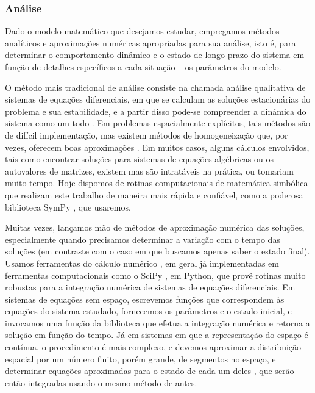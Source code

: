 \documentclass[12pt]{extarticle}
\begin{document}
\subsubsection{Análise}

Dado o modelo matemático que desejamos estudar, empregamos métodos analíticos
e aproximações numéricas apropriadas para sua análise, isto é, para determinar
o comportamento dinâmico e o estado de longo prazo do sistema em função de
detalhes específicos a cada situação -- os parâmetros do modelo.

O método mais tradicional de análise consiste na chamada análise qualitativa
de sistemas de equações diferenciais, em que se calculam as soluções
estacionárias do problema e sua estabilidade, e a partir disso pode-se
compreender a dinâmica do sistema como um todo \citep{murray2002,gurney1998}.
Em problemas espacialmente explícitos, tais métodos são de difícil
implementação, mas existem métodos de homogeneização que, por vezes, oferecem
boas aproximações \citep{cobbold2014}. Em muitos casos, alguns cálculos
envolvidos, tais como encontrar soluções para sistemas de equações algébricas
ou os autovalores de matrizes, existem mas são intratáveis na prática, ou tomariam
muito tempo.
Hoje dispomos de rotinas computacionais de matemática simbólica que realizam este
trabalho de maneira mais rápida e confiável, como a poderosa
biblioteca SymPy \citep{sympy}, que usaremos.

Muitas vezes, lançamos mão de métodos de aproximação numérica das soluções,
especialmente quando precisamos determinar a variação com o tempo das soluções
(em contraste com o caso em que buscamos apenas saber o estado final).  Usamos
ferramentas do cálculo numérico \citep{iserles2009}, em geral já implementadas
em ferramentas computacionais como o SciPy \citep{scipy}, em Python, que provê
rotinas muito robustas para a integração numérica de sistemas de equações
diferenciais. Em sistemas de equações sem espaço, escrevemos funções que
correspondem às equações do sistema estudado, fornecemos os parâmetros e o
estado inicial, e invocamos uma função da biblioteca que efetua a integração
numérica e retorna a solução em função do tempo. Já em sistemas em que a
representação do espaço é contínua, o procedimento é mais complexo, e devemos
aproximar a distribuição espacial por um número finito, porém grande, de
segmentos no espaço, e determinar equações aproximadas para o estado de cada
um deles \citep{iserles2009}, que serão então integradas usando o mesmo método
de antes.
\end{document}
